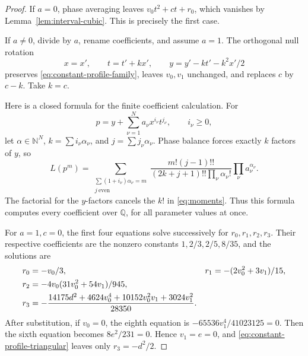 \begin{proof}
If \(a=0\), phase averaging leaves \(v_0t^2+ct+r_0\), which vanishes
by Lemma~\ref{lem:interval-cubic}. This is precisely the first case.

If \(a\ne0\), divide by \(a\), rename coefficients, and assume
\(a=1\). The orthogonal null rotation
\begin{equation}
 x=x',\qquad t=t'+kx',\qquad y=y'-kt'-k^2x'/2
 \label{eq:constant-profile-null-rotation}
\end{equation}
preserves \eqref{eq:constant-profile-family}, leaves \(v_0,v_1\)
unchanged, and replaces \(c\) by \(c-k\). Take \(k=c\).

Here is a closed formula for the finite coefficient calculation. For
\[
 p=y+\sum_{\nu=1}^N a_\nu x^{i_\nu}t^{j_\nu},\qquad i_\nu\ge0,
\]
let \(\alpha\in\mathbb N^N\),
\(k=\sum i_\nu\alpha_\nu\), and \(j=\sum j_\nu\alpha_\nu\).
Phase balance forces exactly \(k\) factors of \(y\), so
\begin{equation}
 L(p^m)=
 \sum_{\substack{\sum(1+i_\nu)\alpha_\nu=m\\j\ \mathrm{even}}}
 \frac{m!(j-1)!!}{(2k+j+1)!!\prod_\nu\alpha_\nu!}
 \prod_\nu a_\nu^{\alpha_\nu}.
 \label{eq:constant-profile-coefficients}
\end{equation}
The factorial for the \(y\)-factors cancels the \(k!\) in
\eqref{eq:moments}. Thus this formula computes every
coefficient over \(\mathbb Q\), for all parameter values at once.

For \(a=1,c=0\), the first four equations solve successively for
\(r_0,r_1,r_2,r_3\). Their respective coefficients are the nonzero
constants \(1,2/3,2/5,8/35\), and the solutions are
\begin{align}
 r_0&=-v_0/3,&
 r_1&=-(2v_0^2+3v_1)/15,\notag\\
 r_2&=-4v_0(31v_0^2+54v_1)/945,\notag\\
 r_3&=-\frac{14175d^2+4624v_0^4+10152v_0^2v_1+3024v_1^2}{28350}.
 \label{eq:constant-profile-triangular}
\end{align}
After substitution, if \(v_0=0\), the eighth equation is
\(-65536v_1^4/41023125=0\). Then the sixth equation becomes
\(8e^2/231=0\). Hence \(v_1=e=0\), and
\eqref{eq:constant-profile-triangular} leaves only \(r_3=-d^2/2\).


\end{proof}
